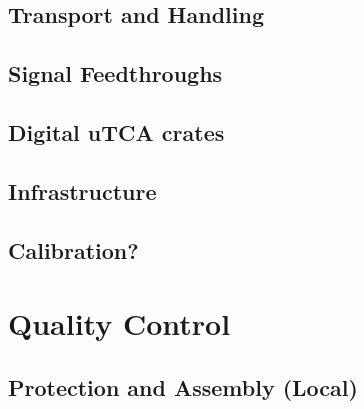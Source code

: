 \subsection{Transport and Handling}
\label{sec:fddp-tpc-elec-install-transport}


\subsection{Signal Feedthroughs}
\label{sec:fddp-tpc-elec-install-sft}

\subsection{Digital uTCA crates}
\label{sec:fddp-tpc-elec-install-utca}

\subsection{Infrastructure}
\label{sec:fddp-tpc-elec-install-cable}



\subsection{Calibration?}
\label{sec:fddp-tpc-elec-install-calib}



\section{Quality Control}
\label{sec:fddp-tpc-elec-qc}

\subsection{Protection and Assembly (Local)}
\label{sec:fddp-tpc-elec-qc-local}


